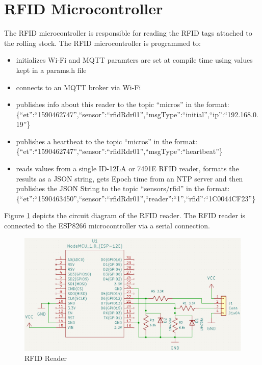 \section{RFID Microcontroller} 
\label{sec:rfid-microcontroller}
The RFID microcontroller is responsible for reading the \ac{RFID} tags attached to the rolling stock. The RFID microcontroller is programmed to:
\begin{itemize}
\item initializes \ac{Wi-Fi} and \ac{MQTT} paramters are set at compile time using values kept in a params.h file
\item connects to an \ac{MQTT} broker via \ac{Wi-Fi}
\item publishes info about this reader to the topic ``micros'' in the format: \\
\{``et'':``1590462747'',``sensor'':``rfidRdr01'',``msgType'':``initial'',``ip'':``192.168.0.19''\}
\item publishes a heartbeat to the topic ``micros'' in the format: \\
\{``et'':``1590462747'',``sensor'':``rfidRdr01'',``msgType'':``heartbeat''\}
\item reads values from a single ID-12LA or 7491E \ac{RFID} reader, formats the results as a \ac{JSON} string, 
gets Epoch time from an \ac{NTP} server and then publishes the \ac{JSON} String to the topic ``sensors/rfid''
in the format: \\
\{``et'':``1590463450'',``sensor'':``rfidRdr01'',``reader'':``1'',``rfid'':``1C0044CF23''\}
\end{itemize}

Figure \ref{fig:rfid-reader} depicts the circuit diagram of the RFID reader. The RFID reader is connected to the ESP8266 microcontroller via a serial connection.

\begin{figure}[htbp]
    \centering
    \includegraphics[width=\textwidth]{rfid-reader.png}
    \caption{RFID Reader}
    \label{fig:rfid-reader}
\end{figure}

